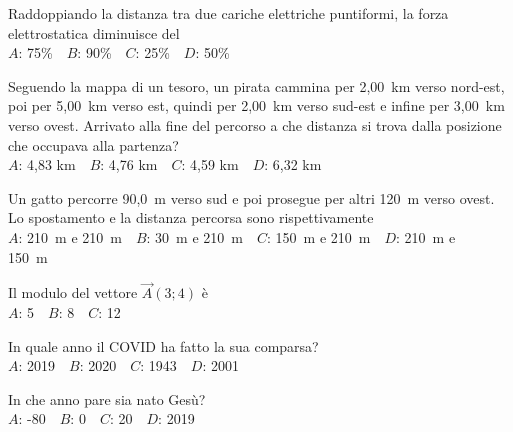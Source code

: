 \mcquestionheader Raddoppiando la distanza tra due cariche elettriche puntiformi, la forza elettrostatica diminuisce del\\
{$A$}: 75\%\ \ {$B$}: 90\%\ \ {$C$}: 25\%\ \ {$D$}: 50\%\ \ 

\mcquestionfooter



\def\mcquestionnumber{3}


\mcquestionheader Seguendo la mappa di un tesoro, un pirata cammina per 2,00~km verso nord-est, poi per 5,00~km verso est, quindi per 2,00~km verso sud-est e infine per 3,00~km verso ovest. Arrivato alla fine del percorso a che distanza si trova dalla posizione che occupava alla partenza?\\
{$A$}: 4,83 km\ \ {$B$}: 4,76 km\ \ {$C$}: 4,59 km\ \ {$D$}: 6,32 km\ \ 

\mcquestionfooter



\def\mcquestionnumber{4}


\mcquestionheader Un gatto percorre 90,0~m verso sud e poi prosegue per altri 120~m verso ovest. Lo spostamento e la distanza percorsa sono rispettivamente\\
{$A$}: 210~m e 210~m\ \ {$B$}: 30~m e 210~m\ \ {$C$}: 150~m e 210~m\ \ {$D$}: 210~m e 150~m\ \ 

\mcquestionfooter



\def\mcquestionnumber{5}


\mcquestionheader Il modulo del vettore $\vec{A}(3;4)$ è\\
{$A$}: 5\ \ {$B$}: 8\ \ {$C$}: 12\ \ 

\mcquestionfooter



\def\mcquestionnumber{6}


\mcquestionheader In quale anno il COVID ha fatto la sua comparsa?\\
{$A$}: 2019\ \ {$B$}: 2020\ \ {$C$}: 1943\ \ {$D$}: 2001\ \ 

\mcquestionfooter



\def\mcquestionnumber{7}


\mcquestionheader In che anno pare sia nato Gesù?\\
{$A$}: -80\ \ {$B$}: 0\ \ {$C$}: 20\ \ {$D$}: 2019\ \ 

\mcquestionfooter



\def\mcquestionnumber{8}


